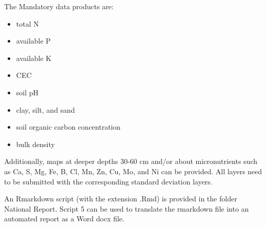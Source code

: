 \documentclass[
  10pt,
  b5paper,
  oneside]{book}
\providecommand{\tightlist}{%
  \setlength{\itemsep}{0pt}\setlength{\parskip}{0pt}}
\begin{document}
The Mandatory data products are:

\begin{itemize}
\tightlist
\item
  total N
\item
  available P
\item
  available K
\item
  CEC
\item
  soil pH
\item
  clay, silt, and sand
\item
  soil organic carbon concentration
\item
  bulk density
\end{itemize}

Additionally, maps at deeper depths 30-60 cm and/or about micronutrients such as Ca, S, Mg, Fe, B, Cl, Mn, Zn, Cu, Mo, and Ni can be provided. All layers need to be submitted with the corresponding standard deviation layers.

An Rmarkdown script (with the extension .Rmd) is provided in the folder National Report. Script 5 can be used to translate the rmarkdown file into an automated report as a Word docx file.
\end{document}

